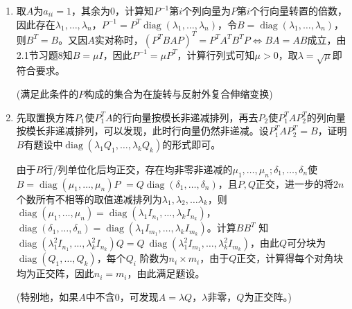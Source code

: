 \documentclass[a4paper,UTF8,fontset=windows]{ctexart}
\DeclareMathOperator{\diag}{diag}
\begin{document}
\begin{enumerate}
\item
取$A$为$a_{ii}=1$，其余为0，计算知$P^{-1}$第$i$个列向量为$P$第$i$个行向量转置的倍数，因此存在$\lambda_1,\dots,\lambda_n$，$P^{-1}=P^T\diag(\lambda_1,\dots,\lambda_n)$，令$B=\diag(\lambda_1,\dots,\lambda_n)$，则$B^T=B$。又因$A$实对称时，$(P^TBAP)^T=P^TA^TB^TP\Leftrightarrow BA=AB$成立，由2.1节习题8知$B=\mu I$，因此$P^{-1}=\mu P^T$，计算行列式可知$\mu>0$，取$\lambda=\sqrt\mu$即符合要求。

(满足此条件的$P$构成的集合为在旋转与反射外复合伸缩变换)

\item
先取置换方阵$P_1$使$P_1^TA$的行向量按模长非递减排列，再去$P_2$使$P_1^TAP_2^T$的列向量按模长非递减排列，可以发现，此时行向量仍然非递减。设$P_1^TAP_2^T=B$，证明$B$有题设中$\diag(\lambda_1Q_1,\dots,\lambda_kQ_k)$的形式即可。

由于$B$行/列单位化后均正交，存在均非零非递减的$\mu_1,\dots,\mu_n;\delta_1,\dots,\delta_n$使$B=\diag(\mu_1,\dots,\mu_n)P$
$=Q\diag(\delta_1,\dots,\delta_n)$，且$P,Q$正交，进一步的将$2n$个数所有不相等的取值递减排列为$\lambda_1,\lambda_2,\dots\lambda_k$，则$\diag(\mu_1,\dots,\mu_n)=\diag(\lambda_1I_{n_1},\dots,\lambda_kI_{n_k})$，$\diag(\delta_1,\dots,\delta_n)=\diag(\lambda_1I_{m_1},\dots,\lambda_kI_{m_k})$。计算$BB^T$ 知$\diag(\lambda_1^2I_{n_1},\dots,\lambda_k^2I_{n_k})Q=Q\ \diag(\lambda_1^2I_{m_1},\dots,\lambda_k^2I_{m_k})$，由此$Q$可分块为$\diag(Q_1,\dots,Q_k)$，每个$Q_i$ 阶数为$n_i\times m_i$，由于$Q$正交，计算得每个对角块均为正交阵，因此$n_i=m_i$，由此满足题设。

(特别地，如果$A$中不含0，可发现$A=\lambda Q$，$\lambda$非零，$Q$为正交阵。)
\end{enumerate}
\end{document}
